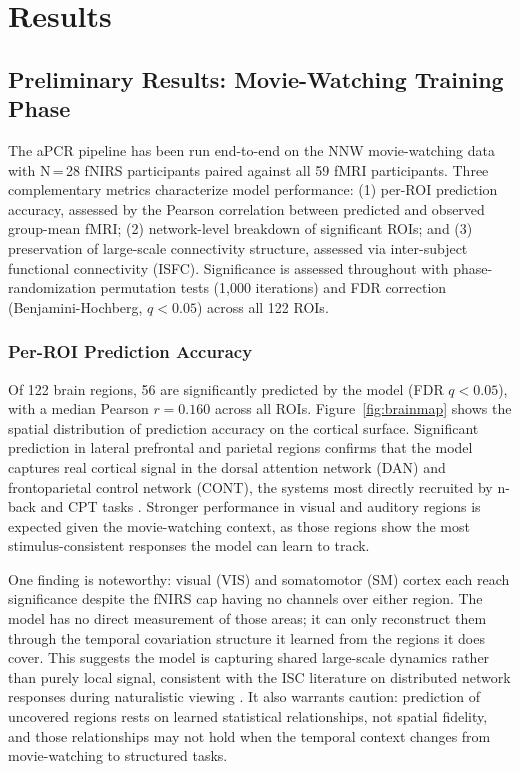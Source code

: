 
\section{Results}

\subsection{Preliminary Results: Movie-Watching Training Phase}

The aPCR pipeline has been run end-to-end on the NNW movie-watching data with N\,=\,28 fNIRS participants paired against all 59 fMRI participants. Three complementary metrics characterize model performance: (1) per-ROI prediction accuracy, assessed by the Pearson correlation between predicted and observed group-mean fMRI; (2) network-level breakdown of significant ROIs; and (3) preservation of large-scale connectivity structure, assessed via inter-subject functional connectivity (ISFC). Significance is assessed throughout with phase-randomization permutation tests (1,000 iterations) and FDR correction (Benjamini-Hochberg, $q < 0.05$) across all 122 ROIs.

\subsubsection{Per-ROI Prediction Accuracy}

Of 122 brain regions, 56 are significantly predicted by the model (FDR $q < 0.05$), with a median Pearson $r = 0.160$ across all ROIs. Figure~\ref{fig:brainmap} shows the spatial distribution of prediction accuracy on the cortical surface. Significant prediction in lateral prefrontal and parietal regions confirms that the model captures real cortical signal in the dorsal attention network (DAN) and frontoparietal control network (CONT), the systems most directly recruited by n-back and CPT tasks \citep{owen2005, cole2013}. Stronger performance in visual and auditory regions is expected given the movie-watching context, as those regions show the most stimulus-consistent responses the model can learn to track.

One finding is noteworthy: visual (VIS) and somatomotor (SM) cortex each reach significance despite the fNIRS cap having no channels over either region. The model has no direct measurement of those areas; it can only reconstruct them through the temporal covariation structure it learned from the regions it does cover. This suggests the model is capturing shared large-scale dynamics rather than purely local signal, consistent with the ISC literature on distributed network responses during naturalistic viewing \citep{hasson2010}. It also warrants caution: prediction of uncovered regions rests on learned statistical relationships, not spatial fidelity, and those relationships may not hold when the temporal context changes from movie-watching to structured tasks.

